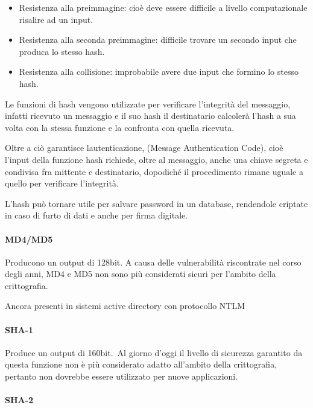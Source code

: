 \documentclass[
]{article}
\providecommand{\tightlist}{%
  \setlength{\itemsep}{0pt}\setlength{\parskip}{0pt}}
\begin{document}
\begin{itemize}
\tightlist
\item
  {Resistenza alla preimmagine: cioè deve essere difficile a livello
  computazionale risalire ad un input.}
\item
  {Resistenza alla seconda preimmagine: difficile trovare un secondo
  input che produca lo stesso hash.}
\item
  {Resistenza alla collisione: improbabile avere due input che formino
  lo stesso hash.}
\end{itemize}

{}

{Le funzioni di hash vengono utilizzate per verificare l'integrità del
messaggio, infatti ricevuto un messaggio e il suo hash il destinatario
calcolerà l'hash a sua volta con la stessa funzione e la confronta con
quella ricevuta.}

{Oltre a ciò garantisce l\textquotesingle autenticazione, (Message
Authentication Code), cioè l'input della funzione hash richiede, oltre
al messaggio, anche una chiave segreta e condivisa fra mittente e
destinatario, dopodiché il procedimento rimane uguale a quello per
verificare l'integrità.}

{L'hash può tornare utile per salvare password in un database,
rendendole criptate in caso di furto di dati e anche per firma
digitale.}

\paragraph{\texorpdfstring{{MD4/MD5}}{MD4/MD5}}\label{h.a2dzw263uiuw}

{Producono un output di 128bit. A causa delle vulnerabilità riscontrate
nel corso degli anni, MD4 e MD5 non sono più considerati sicuri per
l'ambito della crittografia. }

{Ancora presenti in sistemi active directory con protocollo NTLM}

\paragraph{\texorpdfstring{{SHA-1}}{SHA-1}}\label{h.ij2x69r55mz3}

{Produce un output di }{160bit.}{~Al giorno d'oggi il livello di
sicurezza garantito da questa funzione non è più considerato adatto
all'ambito della crittografia, pertanto non dovrebbe essere utilizzato
per nuove applicazioni.}

\paragraph{\texorpdfstring{{SHA-2}}{SHA-2}}\label{h.welsc1ywiyj7}
\end{document}
